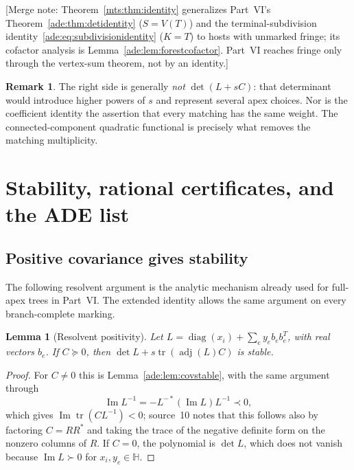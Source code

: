 \documentclass[11pt]{article}
\numberwithin{equation}{section}
\newtheorem{lemma}[theorem]{Lemma}
\theoremstyle{definition}
\newtheorem{remark}[theorem]{Remark}
\newcommand{\diag}{\operatorname{diag}}
\newcommand{\HH}{\mathbb H}
\newcommand{\adj}{\operatorname{adj}}
\newcommand{\tr}{\operatorname{tr}}
\newcommand{\im}{\operatorname{Im}}
\begin{document}
[Merge note: Theorem~\ref{mts:thm:identity} generalizes Part~VI's
Theorem~\ref{ade:thm:detidentity} ($S=V(T)$) and the terminal-subdivision
identity~\eqref{ade:eq:subdivisionidentity} ($K=T$) to hosts with unmarked
fringe; its cofactor analysis is Lemma~\ref{ade:lem:forestcofactor}. Part~VI
reaches fringe only through the vertex-sum theorem, not by an identity.]

\begin{remark}
The right side is generally \emph{not} $\det(L+sC)$: that determinant
would introduce higher powers of $s$ and represent several apex choices.
Nor is the coefficient identity the assertion that every matching has the
same weight. The connected-component quadratic functional is precisely
what removes the matching multiplicity.
\end{remark}

\section{Stability, rational certificates, and the ADE list}\label{mts:sec:spectral}

\subsection{Positive covariance gives stability}

The following resolvent argument is the analytic mechanism already used
for full-apex trees in Part~VI. The extended identity allows the
same argument on every branch-complete marking.

\begin{lemma}[Resolvent positivity]\label{mts:lem:resolvent}
Let $L=\diag(x_i)+\sum_e y_e b_eb_e^T$, with real vectors $b_e$. If
$C\succeq0$, then $\det L+s\tr(\adj(L)C)$ is stable.
\end{lemma}
\begin{proof}
For $C\ne0$ this is Lemma~\ref{ade:lem:covstable}, with the same
argument through
\begin{equation}
 \im L^{-1}=-L^{-*}(\im L)L^{-1}\prec0,
 \label{mts:eq:im-inverse}
\end{equation}
which gives $\im\tr(CL^{-1})<0$; source~10 notes that this follows also by
factoring $C=RR^*$ and taking the trace of the negative definite form on
the nonzero columns of $R$. If $C=0$, the polynomial is $\det L$, which
does not vanish because $\im L\succ0$ for $x_i,y_e\in\HH$.
\end{proof}
\end{document}
